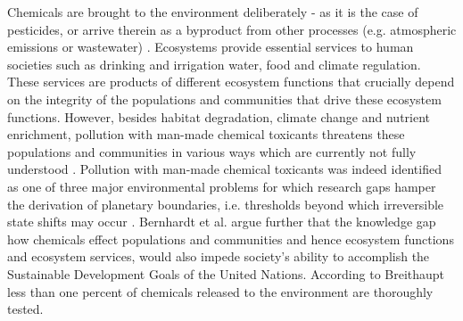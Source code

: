 Chemicals are brought to the environment deliberately - as it is the case of pesticides, or arrive therein as a byproduct from other processes (e.g. atmospheric emissions or wastewater) \citep{schwarzenbach_challenge_2006}. Ecosystems provide essential services to human societies such as drinking and irrigation water, food and climate regulation. These services are products of different ecosystem functions that crucially depend on the integrity of the populations and communities that drive these ecosystem functions. However, besides habitat degradation, climate change and nutrient enrichment, pollution with man-made chemical toxicants threatens these populations and communities in various ways which are currently not fully understood \citep{steffen_anthropocene_2007}. Pollution with man-made chemical toxicants was indeed identified as one of three major environmental problems for which research gaps hamper the derivation of planetary boundaries, i.e. thresholds beyond which irreversible state shifts may occur \citep{steffen_anthropocene_2007}. Bernhardt et al. \citet{bernhardt_synthetic_2017} argue further that the knowledge gap how chemicals effect populations and communities and hence ecosystem functions and ecosystem services, would also impede society's ability to accomplish the Sustainable Development Goals of the United Nations. According to Breithaupt \citet{breithaupt_costs_2006} less than one percent of chemicals released to the environment are thoroughly tested. 




